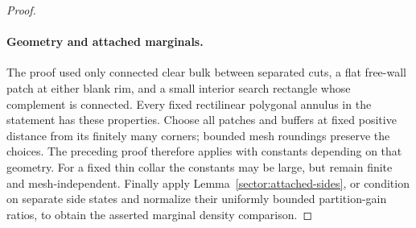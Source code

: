 \begin{proof}
\paragraph{Geometry and attached marginals.}
The proof used only connected clear bulk between separated cuts, a
flat free-wall patch at either blank rim, and a small interior search
rectangle whose complement is connected.  Every fixed rectilinear
polygonal annulus in the statement has these properties.  Choose all
patches and buffers at fixed positive distance from its finitely many
corners; bounded mesh roundings preserve the choices.  The preceding
proof therefore applies with constants depending on that geometry.
For a fixed thin collar the constants may be large, but remain
finite and mesh-independent.  Finally apply
Lemma~\ref{sector:attached-sides}, or condition on separate side
states and normalize their uniformly bounded partition-gain ratios,
to obtain the asserted marginal density comparison.
\end{proof}
